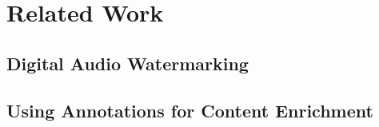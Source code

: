 \chapter{Related Work}

\section{Digital Audio Watermarking}


\section{Using Annotations for Content Enrichment}
